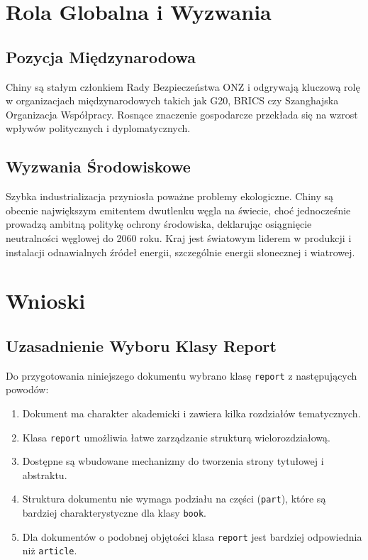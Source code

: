 \documentclass[12pt,a4paper]{report}
\begin{document}
\chapter{Rola Globalna i Wyzwania}

\section{Pozycja Międzynarodowa}

Chiny są stałym członkiem Rady Bezpieczeństwa ONZ i odgrywają kluczową rolę w organizacjach międzynarodowych takich jak G20, BRICS czy Szanghajska Organizacja Współpracy. Rosnące znaczenie gospodarcze przekłada się na wzrost wpływów politycznych i dyplomatycznych.

\section{Wyzwania Środowiskowe}

Szybka industrializacja przyniosła poważne problemy ekologiczne. Chiny są obecnie największym emitentem dwutlenku węgla na świecie, choć jednocześnie prowadzą ambitną politykę ochrony środowiska, deklarując osiągnięcie neutralności węglowej do 2060 roku. Kraj jest światowym liderem w produkcji i instalacji odnawialnych źródeł energii, szczególnie energii słonecznej i wiatrowej.

\chapter{Wnioski}

\section{Uzasadnienie Wyboru Klasy Report}

Do przygotowania niniejszego dokumentu wybrano klasę \texttt{report} z następujących powodów:
\begin{enumerate}
\item Dokument ma charakter akademicki i zawiera kilka rozdziałów tematycznych.
\item Klasa \texttt{report} umożliwia łatwe zarządzanie strukturą wielorozdziałową.
\item Dostępne są wbudowane mechanizmy do tworzenia strony tytułowej i abstraktu.
\item Struktura dokumentu nie wymaga podziału na części (\texttt{part}), które są bardziej charakterystyczne dla klasy \texttt{book}.
\item Dla dokumentów o podobnej objętości klasa \texttt{report} jest bardziej odpowiednia niż \texttt{article}.
\end{enumerate}
\end{document}
